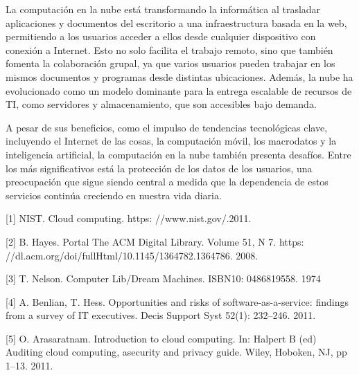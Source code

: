 \documentclass[a4paper,10pt]{article}
\begin{document}
La computación en la nube está transformando la informática al trasladar aplicaciones y documentos del escritorio a una infraestructura basada en la web, permitiendo a los usuarios acceder a ellos desde cualquier dispositivo con conexión a Internet. Esto no solo facilita el trabajo remoto, sino que también fomenta la colaboración grupal, ya que varios usuarios pueden trabajar en los mismos documentos y programas desde distintas ubicaciones. Además, la nube ha evolucionado como un modelo dominante para la entrega escalable de recursos de TI, como servidores y almacenamiento, que son accesibles bajo demanda.

A pesar de sus beneficios, como el impulso de tendencias tecnológicas clave, incluyendo el Internet de las cosas, la computación móvil, los macrodatos y la inteligencia artificial, la computación en la nube también presenta desafíos. Entre los más significativos está la protección de los datos de los usuarios, una preocupación que sigue siendo central a medida que la dependencia de estos servicios continúa creciendo en nuestra vida diaria.


% 



[1] NIST. Cloud computing. https: //www.nist.gov/.2011.

[2] B. Hayes. Portal The ACM Digital Library. Volume 51, N 7. https: //dl.acm.org/doi/fullHtml/10.1145/1364782.1364786. 2008.

[3] T. Nelson. Computer Lib/Dream Machines. ISBN10: 0486819558. 1974

[4] A. Benlian, T. Hess. Opportunities and risks of software-as-a-service: findings from a survey of IT executives. Decis Support Syst 52(1): 232–246. 2011.

[5] O. Arasaratnam. Introduction to cloud computing. In: Halpert B (ed) Auditing cloud computing, asecurity and privacy guide. Wiley, Hoboken, NJ,
pp 1–13. 2011.
\end{document}
